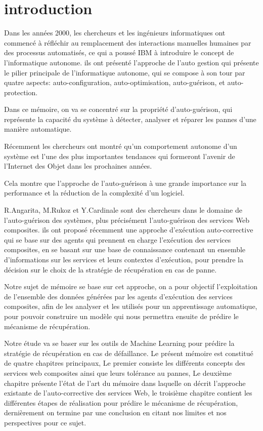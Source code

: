 \vspace{1cm}


\chapter{introduction}

Dans les années 2000, les chercheurs et les ingénieurs informatiques ont commencé à réfléchir au remplacement des interactions manuelles humaines par des processus automatisés, ce qui a poussé IBM à introduire le concept de l'informatique autonome. ils ont présenté l'approche de l'auto gestion qui présente le pilier principale de l'informatique autonome, qui se compose à son tour par quatre aspects: auto-configuration, auto-optimisation, auto-guérison, et auto-protection.

Dans ce mémoire, on va se concentré sur la propriété d'auto-guérison, qui représente la capacité du système à détecter, analyser et réparer les pannes d'une manière automatique.

Récemment les chercheurs ont montré qu'un comportement autonome d'un système est l'une des plus importantes tendances qui formeront l'avenir de l'Internet des Objet dans les prochaines années.

Cela montre que l'approche de l'auto-guérison à une grande importance sur la performance et la réduction de la complexité d'un logiciel.

R.Angarita, M.Rukoz et Y.Cardinale sont des chercheurs dans le domaine de l'auto-guérison des systèmes, plus précisément l'auto-guérison des services Web composites. ils ont proposé récemment une approche d'exécution auto-corrective qui se base sur des agents qui prennent en charge l'exécution des services composites, en se basant sur une base de connaissance contenant un ensemble d'informations sur les services et leurs contextes d'exécution, pour prendre la décision sur le choix de la stratégie de récupération en cas de panne.

Notre sujet de mémoire se base sur cet approche, on a pour objectif l'exploitation de l'ensemble des données générées par les agents d'exécution des services composites, afin de les analyser et les utilisés pour un apprentissage automatique, pour pouvoir construire un modèle qui nous permettra ensuite de prédire le mécanisme de récupération.

Notre étude va se baser sur les outils de Machine Learning pour prédire la stratégie de récupération en cas de défaillance.
Le présent mémoire est constitué de quatre chapitres principaux, Le premier consiste les différents concepts des services web composites ainsi que leurs tolérance au pannes, Le deuxième chapitre présente l'état de l'art du mémoire dans laquelle on décrit l'approche existante de l'auto-corrective des services Web, le troisième chapitre contient les différentes étapes de réalisation pour prédire le mécanisme de récupération, dernièrement on termine par une conclusion en citant nos limites et nos perspectives pour ce sujet.